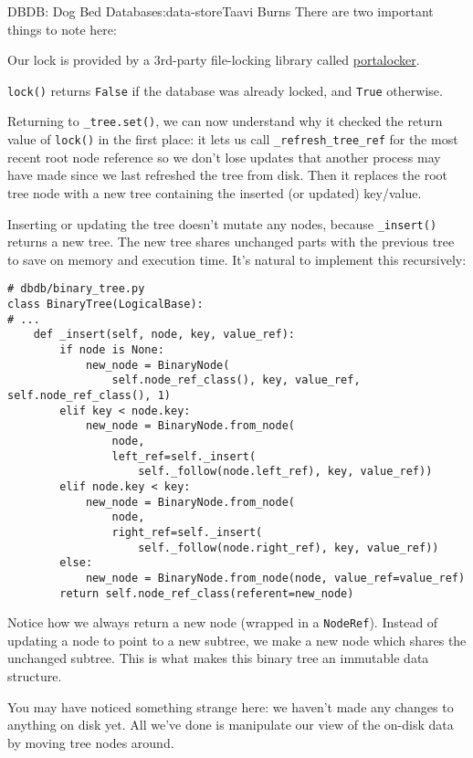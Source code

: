 \begin{aosachapter}{DBDB: Dog Bed Database}{s:data-store}{Taavi Burns}
There are two important things to note here:

\begin{aosaitemize}

\item
  Our lock is provided by a 3rd-party file-locking library called
  \href{https://pypi.python.org/pypi/portalocker}{portalocker}.
\item
  \texttt{lock()} returns \texttt{False} if the database was already
  locked, and \texttt{True} otherwise.
\end{aosaitemize}

Returning to \texttt{\_tree.set()}, we can now understand why it checked
the return value of \texttt{lock()} in the first place: it lets us call
\texttt{\_refresh\_tree\_ref} for the most recent root node reference so
we don't lose updates that another process may have made since we last
refreshed the tree from disk. Then it replaces the root tree node with a
new tree containing the inserted (or updated) key/value.

Inserting or updating the tree doesn't mutate any nodes, because
\texttt{\_insert()} returns a new tree. The new tree shares unchanged
parts with the previous tree to save on memory and execution time. It's
natural to implement this recursively:

\begin{verbatim}
# dbdb/binary_tree.py
class BinaryTree(LogicalBase):
# ...
    def _insert(self, node, key, value_ref):
        if node is None:
            new_node = BinaryNode(
                self.node_ref_class(), key, value_ref, self.node_ref_class(), 1)
        elif key < node.key:
            new_node = BinaryNode.from_node(
                node,
                left_ref=self._insert(
                    self._follow(node.left_ref), key, value_ref))
        elif node.key < key:
            new_node = BinaryNode.from_node(
                node,
                right_ref=self._insert(
                    self._follow(node.right_ref), key, value_ref))
        else:
            new_node = BinaryNode.from_node(node, value_ref=value_ref)
        return self.node_ref_class(referent=new_node)
\end{verbatim}

Notice how we always return a new node (wrapped in a \texttt{NodeRef}).
Instead of updating a node to point to a new subtree, we make a new node
which shares the unchanged subtree. This is what makes this binary tree
an immutable data structure.

You may have noticed something strange here: we haven't made any changes
to anything on disk yet. All we've done is manipulate our view of the
on-disk data by moving tree nodes around.


\end{aosachapter}
